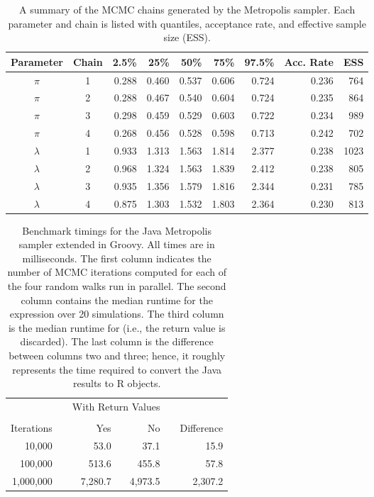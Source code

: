 \vspace{0.33cm}

\begin{table}[h!]
\centering
\caption{A summary of the MCMC chains generated by the Metropolis sampler. Each parameter and chain is listed with quantiles, acceptance rate, and effective sample size (ESS).}
\begin{tabular}{ccrrrrrrr}
\toprule
Parameter & Chain & 2.5\% & 25\% & 50\% & 75\% & 97.5\% & Acc. Rate & ESS \\ \midrule
$\pi$ &    1 & 0.288 & 0.460 & 0.537 & 0.606 & 0.724 & 0.236 &  764 \\ 
$\pi$ &    2 & 0.288 & 0.467 & 0.540 & 0.604 & 0.724 & 0.235 &  864 \\ 
$\pi$ &    3 & 0.298 & 0.459 & 0.529 & 0.603 & 0.722 & 0.234 &  989 \\ 
$\pi$ &    4 & 0.268 & 0.456 & 0.528 & 0.598 & 0.713 & 0.242 &  702 \\ 
$\lambda$ &    1 & 0.933 & 1.313 & 1.563 & 1.814 & 2.377 & 0.238 & 1023 \\ 
$\lambda$ &    2 & 0.968 & 1.324 & 1.563 & 1.839 & 2.412 & 0.238 &  805 \\ 
$\lambda$ &    3 & 0.935 & 1.356 & 1.579 & 1.816 & 2.344 & 0.231 &  785 \\ 
$\lambda$ &    4 & 0.875 & 1.303 & 1.532 & 1.803 & 2.364 & 0.230 &  813 \\ \bottomrule
\end{tabular}
\label{tab:mcmcx}
\end{table}

\vspace{0.33cm}

\begin{table}[h!]
\centering
\caption{Benchmark timings for the Java Metropolis sampler extended in Groovy. All times are in milliseconds. The first column indicates the number of MCMC iterations computed for each of the four random walks run in parallel. The second column contains the median runtime for the expression  over 20 simulations. The third column is the median runtime for  (i.e., the return value is discarded). The last column is the difference between columns two and three; hence, it roughly represents the time required to convert the Java results to R objects.}
\begin{tabular}{rrrrrr}
\toprule
& & \multicolumn{2}{c}{With Return Values} & & \\
\cline{3-4} \\[-8pt]
Iterations & & \multicolumn{1}{r}{Yes} & \multicolumn{1}{r}{No} & & Difference \\ \midrule 
10,000 & & 53.0 & 37.1 & & 15.9 \\
100,000 & & 513.6 & 455.8 & & 57.8 \\
1,000,000 & & 7,280.7 & 4,973.5 & & 2,307.2 \\ \bottomrule
\end{tabular}
\label{tab:mcmcgroovy}
\end{table}

